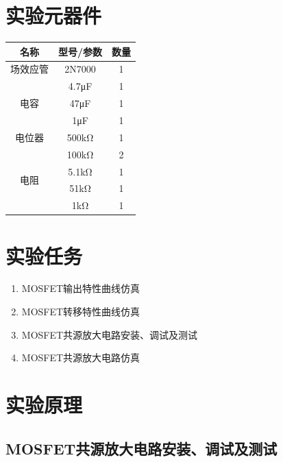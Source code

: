 \documentclass[a4paper,11pt,UTF8]{article}
\numberwithin{equation}{subsection}
\begin{document}
\section{实验元器件}
\begin{table}[h]
	\centering
	\begin{tabular}{|c|c|c|}
		\hline
		名称 & 型号/参数 & 数量\\
		\hline
		场效应管 & 2N7000 & 1\\
		\hline
		\multirow{3}{*}{电容} & 4.7μF & 1 \\
		\cline{2-3}
		 & 47μF & 1\\
		\cline{2-3}
		 & 1μF & 1\\
		\hline
		电位器 & 500kΩ & 1\\
		\hline
		\multirow{4}{*}{电阻} & 100kΩ & 2 \\
		\cline{2-3}
		 & 5.1kΩ & 1\\
		\cline{2-3}
		 & 51kΩ & 1\\
		\cline{2-3}
 		 & 1kΩ & 1\\
		\hline 		
	\end{tabular}
\end{table}

\section{实验任务}
\begin{enumerate}
	\item MOSFET输出特性曲线仿真
	\item MOSFET转移特性曲线仿真
	\item MOSFET共源放大电路安装、调试及测试
	\item MOSFET共源放大电路仿真
\end{enumerate}

\section{实验原理}
\subsection{MOSFET共源放大电路安装、调试及测试}
\end{document}
